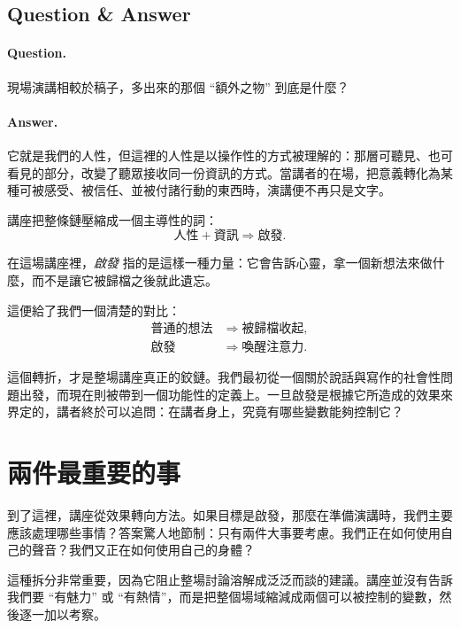 \subsection{Question \& Answer}

\paragraph{Question.} 現場演講相較於稿子，多出來的那個 ``額外之物'' 到底是什麼？

\paragraph{Answer.} 它就是我們的人性，但這裡的人性是以操作性的方式被理解的：那層可聽見、也可看見的部分，改變了聽眾接收同一份資訊的方式。當講者的在場，把意義轉化為某種可被感受、被信任、並被付諸行動的東西時，演講便不再只是文字。

講座把整條鏈壓縮成一個主導性的詞：
\begin{equation}
\text{人性} + \text{資訊} \Longrightarrow \text{啟發}.
\end{equation}

\begin{definition}
在這場講座裡，\emph{啟發} 指的是這樣一種力量：它會告訴心靈，拿一個新想法來做什麼，而不是讓它被歸檔之後就此遺忘。
\end{definition}

這便給了我們一個清楚的對比：
\begin{align}
\text{普通的想法} &\Longrightarrow \text{被歸檔收起}, \\
\text{啟發} &\Longrightarrow \text{喚醒注意力}.
\end{align}

這個轉折，才是整場講座真正的鉸鏈。我們最初從一個關於說話與寫作的社會性問題出發，而現在則被帶到一個功能性的定義上。一旦啟發是根據它所造成的效果來界定的，講者終於可以追問：在講者身上，究竟有哪些變數能夠控制它？

\section{兩件最重要的事}

到了這裡，講座從效果轉向方法。如果目標是啟發，那麼在準備演講時，我們主要應該處理哪些事情？答案驚人地節制：只有兩件大事要考慮。我們正在如何使用自己的聲音？我們又正在如何使用自己的身體？

這種拆分非常重要，因為它阻止整場討論溶解成泛泛而談的建議。講座並沒有告訴我們要 ``有魅力'' 或 ``有熱情''，而是把整個場域縮減成兩個可以被控制的變數，然後逐一加以考察。

